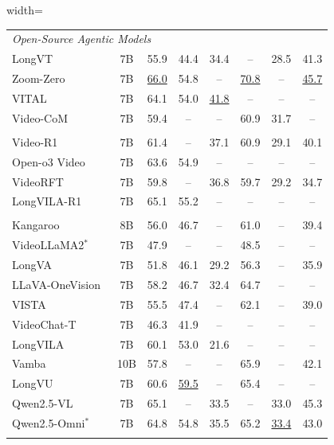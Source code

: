 \documentclass{article}
\theoremstyle{plain}
\theoremstyle{definition}
\theoremstyle{remark}
\begin{document}
\begin{table}[t]
\begin{center}
\begin{normalsize}
\begin{adjustbox}{width=\textwidth}
\begin{tabular}{l c cc cccc}
\multicolumn{8}{l}{\textit{Open-Source Agentic Models}} \\
LongVT~\cite{longvt} & 7B & 55.9 & 44.4 & 34.4 & -- & 28.5 & 41.3 \\
Zoom-Zero~\cite{zoomzero} & 7B & \underline{66.0} & 54.8 & -- & \underline{70.8} & -- & \underline{45.7} \\
VITAL~\cite{vital} & 7B & 64.1 & 54.0 & \underline{41.8} & -- & -- & -- \\
Video-CoM~\cite{videocom} & 7B & 59.4 & -- & -- & 60.9 & 31.7 & -- \\
\midrule \addlinespace[0.2em]

\multicolumn{8}{l}{\textit{Open-Source Thinking Models}} \\
Video-R1~\cite{feng2025video} & 7B & 61.4 & -- & 37.1 & 60.9 & 29.1 & 40.1 \\
Open-o3 Video~\cite{openo3video} & 7B & 63.6 & 54.9 & -- & -- & -- & -- \\
VideoRFT~\cite{wang2025videorft} & 7B & 59.8 & -- & 36.8 & 59.7 & 29.2 & 34.7 \\
LongVILA-R1~\cite{chen2025scaling} & 7B & 65.1 & 55.2 & -- & -- & -- & -- \\
\midrule \addlinespace[0.2em]

\multicolumn{8}{l}{\textit{Open-Source Non-Thinking Models}} \\
Kangaroo~\cite{liu2024kangaroo} & 8B & 56.0 & 46.7 & -- & 61.0 & -- & 39.4 \\
VideoLLaMA2$^*$~\cite{videollama2} & 7B & 47.9 & -- & -- & 48.5 & -- & -- \\
LongVA~\cite{zhang2024long} & 7B & 51.8 & 46.1 & 29.2 & 56.3 & -- & 35.9 \\
LLaVA-OneVision~\cite{li2024llava} & 7B & 58.2 & 46.7 & 32.4 & 64.7 & -- & -- \\
VISTA~\cite{ren2025vista} & 7B & 55.5 & 47.4 & -- & 62.1 & -- & 39.0 \\
VideoChat-T~\cite{zeng2024timesuite} & 7B & 46.3 & 41.9 & -- & -- & -- & -- \\
LongVILA~\cite{chen2024longvila} & 7B & 60.1 & 53.0 & 21.6 & -- & -- & -- \\
Vamba~\cite{ren2025vamba} & 10B & 57.8 & -- & -- & 65.9 & -- & 42.1 \\
LongVU~\cite{shen2024longvu} & 7B & 60.6 & \underline{59.5} & -- & 65.4 & -- & -- \\
Qwen2.5-VL~\cite{qwen2.5vl} & 7B & 65.1 & -- & 33.5 & -- & 33.0 & 45.3 \\
Qwen2.5-Omni$^*$~\cite{qwen2.5omni} & 7B & 64.8 & 54.8 & 35.5 & 65.2 & \underline{33.4} & 43.0 \\
\midrule \addlinespace[0.3em]


\end{tabular}
\end{adjustbox}
\end{normalsize}
\end{center}
\end{table}
\end{document}
